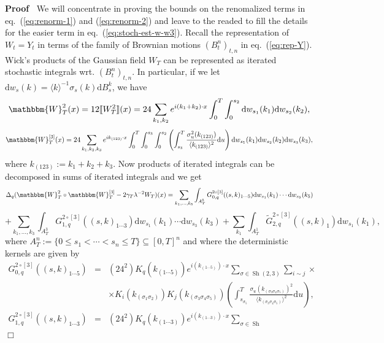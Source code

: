 \documentclass[11pt, oneside]{article}   	%
\newcommand{\assign}{:=}
\newcommand{\mathd}{\mathrm{d}}
\newcommand{\tmop}[1]{\ensuremath{\operatorname{#1}}}
\newenvironment{proof}{\noindent\textbf{Proof\ }}{\hspace*{\fill}$\Box$\medskip}
\begin{document}
\begin{proof}
  We will concentrate in proving the bounds on the renomalized terms in
  eq.~(\ref{eq:renorm-1}) and (\ref{eq:renorm-2}) and leave to the readed to
  fill the details for the easier term in eq.~(\ref{eq:stoch-est-w-w3}).
  Recall the representation of $W_t = Y_t$ in terms of the family of Brownian
  motions $(B_t^n)_{t, n}$ in eq.~(\ref{eq:rep-Y}). Wick's products of the
  Gaussian field $W_T$ can be represented as iterated stochastic integrals
  wrt. $(B_t^n)_{t, n}$. In particular, if we let $\mathd w_s (k) = \langle k
  \rangle^{- 1} \sigma_s (k) \mathd B_s^k$, we have
  \[ \mathbbm{W}^2_T (x) = 12 \llbracket W_T^2 \rrbracket (x) = 24 \sum_{k_1,
     k_2} e^{i (k_1 + k_2) \cdot x} \int_0^T \int_0^{s_2} \mathd w_{s_1} (k_1)
     \mathd w_{s_2} (k_2), \]
  \[ \mathbbm{W}^{[3]}_T (x) = 24 \sum_{k_1, k_2, k_3} e^{i k_{(123)} \cdot x}
     \int_0^T \int_0^{s_3} \int_0^{s_2} \left( \int_{s_3}^T \frac{\sigma_u^2
     (k_{(123)})}{\langle k_{(123)} \rangle^2} \mathd u \right) \mathd w_{s_1}
     (k_1) \mathd w_{s_2} (k_2) \mathd w_{s_3} (k_3), \]
  where $k_{(123)} \assign k_1 + k_2 + k_3$. Now products of iterated
  integrals can be decomposed in sums of iterated integrals and we get
  \[ \Delta_q (\mathbbm{W}^2_T \circ \mathbbm{W}^{[3]}_T - 2 \gamma_T
     \lambda^{- 2} W_T) (x) = \sum_{k_1, \ldots, k_5} \int_{A_T^5} G^{2 \circ
     [3]}_{0, q} ((s, k)_{1 \cdots 5}) \mathd w_{s_1} (k_1) \cdots \mathd
     w_{s_5} (k_5) \]
  \[ + \sum_{k_1, \ldots, k_3} \int_{A_T^3} G^{2 \circ [3]}_{1, q} ((s, k)_{1
     \cdots 3}) \mathd w_{s_1} (k_1) \cdots \mathd w_{s_3} (k_3) + \sum_{k_1}
     \int_{A_T^1} \tilde{G}^{2 \circ [3]}_{2, q} ((s, k)_1) \mathd w_{s_1}
     (k_1), \]
  where $A^n_T \assign \{ 0 \leqslant s_1 < \cdots < s_n \leqslant T \}
  \subseteq [0, T]^n$ and where the deterministic kernels are given by
  \begin{eqnarray*}
    G^{2 \circ [3]}_{0, q} ((s, k)_{1 \cdots 5}) & = & (24^2) K_q (k_{(1
    \cdots 5)}) e^{i (k_{(1 \cdots 5)}) \cdot x} \sum_{\sigma \in \tmop{Sh}
    (2, 3)} \sum_{i \sim j} \times\\
    &  & \times K_i (k_{(\sigma_1 \sigma_2)}) K_j (k_{(\sigma_3 \sigma_4
    \sigma_5)}) \left( \int_{s_{\sigma_5}}^T \frac{\sigma_u (k_{(\sigma_3
    \sigma_4 \sigma_5)})^2}{\langle k_{(\sigma_3 \sigma_4 \sigma_5)}
    \rangle^2} \mathd u \right),\\
    G^{2 \circ [3]}_{1, q} ((s, k)_{1 \cdots 3}) & = & (24^2) K_q (k_{(1
    \cdots 3)}) e^{i (k_{(1 \cdots 3)}) \cdot x} \sum_{\sigma \in \tmop{Sh}
}
\end{eqnarray*}
\end{proof}
\end{document}
